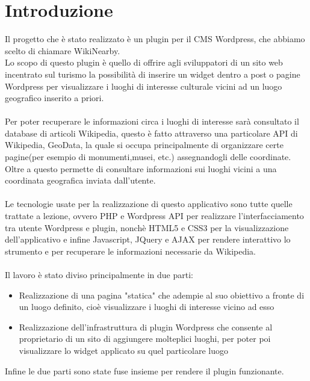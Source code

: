 \section*{Introduzione}
Il progetto che è stato realizzato è un plugin per il CMS Wordpress, che abbiamo scelto di chiamare WikiNearby.\\
Lo scopo di questo plugin è quello di offrire agli sviluppatori di un sito web incentrato sul turismo la possibilità di inserire un widget dentro a post o pagine Wordpress per visualizzare i luoghi di interesse culturale vicini ad un luogo geografico inserito a priori.\\\\
Per poter recuperare le informazioni circa i luoghi di interesse sarà consultato il database di articoli Wikipedia, questo è fatto attraverso una particolare API di Wikipedia, GeoData, la quale si occupa principalmente di organizzare certe pagine(per esempio di monumenti,musei, etc.) assegnandogli delle coordinate.\\
Oltre a questo permette di consultare informazioni sui luoghi vicini a una coordinata geografica inviata dall'utente.\\\\
Le tecnologie usate per la realizzazione di questo applicativo sono tutte quelle trattate a lezione, ovvero PHP e Wordpress API per realizzare l'interfacciamento tra utente Wordpress e plugin, nonchè HTML5 e CSS3 per la visualizzazione dell'applicativo e infine Javascript, JQuery e AJAX per rendere interattivo lo strumento e per recuperare le informazioni necessarie da Wikipedia.\\\\
Il lavoro è stato diviso principalmente in due parti: 
\begin{itemize}
    \item Realizzazione di una pagina "statica" che adempie al suo obiettivo a fronte di un luogo definito, cioè visualizzare i luoghi di interesse vicino ad esso
    \item Realizzazione dell'infrastruttura di plugin Wordpress che consente al proprietario di un sito di aggiungere molteplici luoghi, per poter poi visualizzare lo widget applicato su quel particolare luogo
\end{itemize}
Infine le due parti sono state fuse insieme per rendere il plugin funzionante.